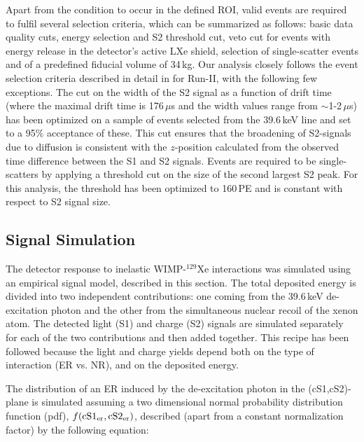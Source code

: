 Apart from the condition to occur in the defined ROI, valid events are required to fulfil several selection criteria, 
which can be summarized as follows: basic data quality cuts, energy selection and S2 threshold cut, veto cut for events with energy release in the detector's 
active LXe shield, selection of single-scatter events and of a predefined fiducial volume of 34\,kg.  
Our analysis closely follows the event selection criteria described in detail in \cite{Aprile:2012vw} for Run-II, with the following few exceptions. 
The cut on the width of the S2 signal as a function of drift time (where the maximal drift time is 176\,$\mu$s and the width values range from $\sim$1-2\,$\mu$s) has been optimized on a sample of events selected from the 39.6\,keV line and set to a 95\% acceptance of these. This cut ensures that the broadening of S2-signals due to diffusion is consistent with the $z$-position calculated from the observed time difference between the S1 and S2 signals. Events are required to be single-scatters by applying a threshold cut on the size of the 
second largest S2 peak. For this analysis, the threshold has been optimized to 160\,PE and is constant with respect to S2 signal size. 


\subsection{Signal Simulation} 
\label{sec:signal}

The detector response to inelastic WIMP-$^{129}$Xe interactions was simulated using an empirical signal model, described in this section.
The total deposited energy is divided into two independent contributions: one coming from the 39.6\,keV de-excitation photon and the other  from  
the simultaneous nuclear recoil of the xenon atom. The detected light (S1) and charge (S2) signals are simulated separately for each of the two contributions 
and then added together. This recipe has been followed  because the light and charge yields depend both on the type of interaction (ER vs. NR), and on the deposited energy.


The distribution of an ER induced by the de-excitation photon in the (cS1,cS2)-plane  is simulated assuming a two dimensional normal probability distribution function (pdf), $f(\rm{cS1}_{er},\rm{cS2}_{er})$, 
described (apart from a constant normalization factor) by the following equation:

